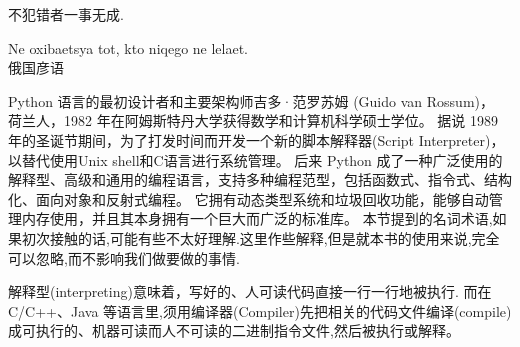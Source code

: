 \documentclass[main.tex]{subfiles}
\begin{document}
\begin{flushright}
	\begin{kaishu}
		不犯错者一事无成.\\
	\end{kaishu}
{\selectfont Ne oxibaet{}s{ya} tot, kto niqego ne lelaet.}\\
俄国彦语
\end{flushright}

Python 语言的最初设计者和主要架构师吉多·范罗苏姆 (Guido van Rossum)， 荷兰人，1982 年在阿姆斯特丹大学获得数学和计算机科学硕士学位。
据说 1989 年的圣诞节期间，为了打发时间而开发一个新的脚本解释器(Script Interpreter)，以替代使用Unix shell和C语言进行系统管理。
后来 Python 成了一种广泛使用的解释型、高级和通用的编程语言，支持多种编程范型，包括函数式、指令式、结构化、面向对象和反射式编程。
它拥有动态类型系统和垃圾回收功能，能够自动管理内存使用，并且其本身拥有一个巨大而广泛的标准库。
本节提到的名词术语,如果初次接触的话,可能有些不太好理解.这里作些解释,但是就本书的使用来说,完全可以忽略,而不影响我们做要做的事情.

解释型(interpreting)意味着，写好的、人可读代码直接一行一行地被执行. 而在 C/C++、Java 等语言里,须用编译器(Compiler)先把相关的代码文件编译(compile)
成可执行的、机器可读而人不可读的二进制指令文件,然后被执行或解释。
\end{document}
